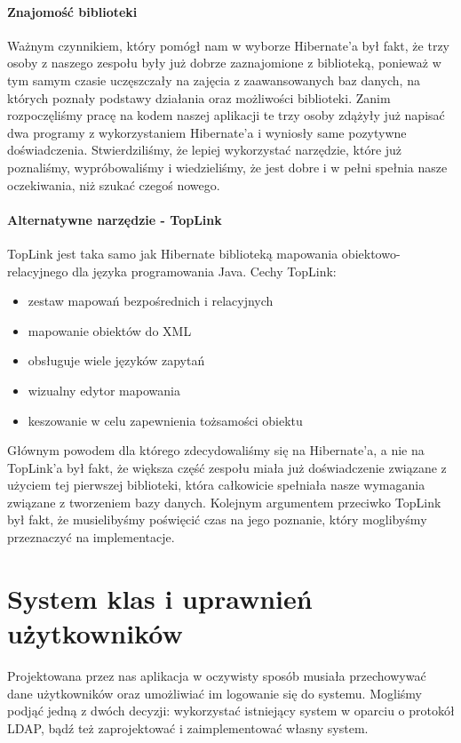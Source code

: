 \documentclass[licencjacka]{pracamgr}
\begin{document}
\paragraph{Znajomość biblioteki} 
Ważnym czynnikiem, który pomógł nam w wyborze Hibernate'a był fakt, że trzy osoby z naszego zespołu 
były już dobrze zaznajomione z biblioteką, ponieważ w tym samym czasie uczęszczały na zajęcia z zaawansowanych baz danych, na których 
poznały podstawy działania oraz możliwości biblioteki. Zanim rozpoczęliśmy pracę na kodem naszej aplikacji te trzy osoby zdążyły już 
napisać dwa programy z wykorzystaniem Hibernate'a i wyniosły same pozytywne doświadczenia. Stwierdziliśmy, że lepiej wykorzystać narzędzie, 
które już poznaliśmy, wypróbowaliśmy i wiedzieliśmy, że jest dobre i w pełni spełnia nasze oczekiwania, niż szukać czegoś nowego.

\paragraph{Alternatywne narzędzie - TopLink}
TopLink jest taka samo jak Hibernate biblioteką mapowania obiektowo-relacyjnego dla języka programowania Java. Cechy TopLink:
\begin{itemize}
\item zestaw mapowań bezpośrednich i relacyjnych
\item mapowanie obiektów do XML
\item obsługuje wiele języków zapytań
\item wizualny edytor mapowania
\item keszowanie w celu zapewnienia tożsamości obiektu
\end{itemize}
Głównym powodem dla którego zdecydowaliśmy się na Hibernate'a, a nie na TopLink'a był fakt, że większa część zespołu miała już 
doświadczenie związane z użyciem tej pierwszej biblioteki, która całkowicie spełniała nasze wymagania związane z tworzeniem bazy 
danych. Kolejnym argumentem przeciwko TopLink był fakt, że musielibyśmy poświęcić czas na jego poznanie, który moglibyśmy 
przeznaczyć na implementacje.

\section{System klas i uprawnień użytkowników}
Projektowana przez nas aplikacja w oczywisty sposób musiała przechowywać dane użytkowników oraz umożliwiać im logowanie się do systemu. Mogliśmy podjąć jedną z dwóch decyzji: wykorzystać istniejący system w oparciu o protokół LDAP, bądź też zaprojektować i zaimplementować własny system.
\end{document}
